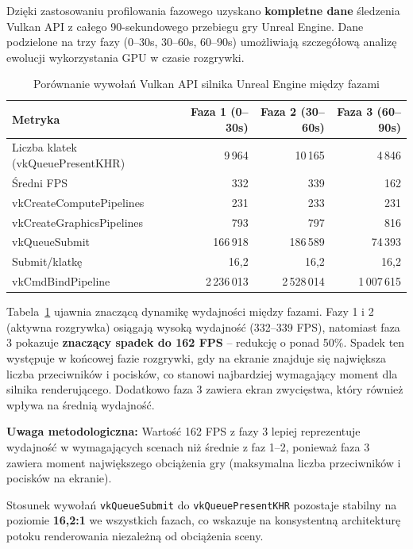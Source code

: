 Dzięki zastosowaniu profilowania fazowego uzyskano \textbf{kompletne dane} śledzenia Vulkan API z całego 90-sekundowego przebiegu gry Unreal Engine. 
Dane podzielone na trzy fazy (0--30s, 30--60s, 60--90s) umożliwiają szczegółową analizę ewolucji wykorzystania GPU w czasie rozgrywki.
\begingroup
  \setlength{\textfloatsep}{0.5\baselineskip}
  \setlength{\intextsep}{0.5\baselineskip}
  \begin{table}[H]
\centering
\caption{Porównanie wywołań Vulkan API silnika Unreal Engine między fazami}
\label{tab:unreal-vulkan-phases}
\small
\begin{tabular}{|l|r|r|r|}
\hline
\textbf{Metryka} & \textbf{Faza 1 (0--30s)} & \textbf{Faza 2 (30--60s)} & \textbf{Faza 3 (60--90s)} \\
\hline
Liczba klatek (vkQueuePresentKHR) & 9\,964 & 10\,165 & 4\,846 \\
Średni FPS & 332 & 339 & 162 \\
vkCreateComputePipelines & 231 & 233 & 231 \\
vkCreateGraphicsPipelines & 793 & 797 & 816 \\
vkQueueSubmit & 166\,918 & 186\,589 & 74\,393 \\
Submit/klatkę & 16,2 & 16,2 & 16,2 \\
vkCmdBindPipeline & 2\,236\,013 & 2\,528\,014 & 1\,007\,615 \\
\hline
\end{tabular}
\end{table}

\endgroup
Tabela~\ref{tab:unreal-vulkan-phases} ujawnia znaczącą dynamikę wydajności między fazami. 
Fazy 1 i 2 (aktywna rozgrywka) osiągają wysoką wydajność
(332--339 FPS), natomiast faza 3 pokazuje \textbf{znaczący spadek do 162 FPS} -- redukcję o
ponad 50\%. Spadek ten występuje w końcowej fazie
rozgrywki, gdy na ekranie znajduje się największa liczba przeciwników i pocisków, co stanowi 
najbardziej wymagający moment dla silnika renderującego.
Dodatkowo faza 3 zawiera ekran zwycięstwa, który również wpływa na średnią wydajność.

\textbf{Uwaga metodologiczna:} Wartość 162 FPS z fazy 3 lepiej reprezentuje wydajność w wymagających
scenach niż średnie z faz 1--2, ponieważ faza 3 zawiera moment największego obciążenia gry
(maksymalna liczba przeciwników i pocisków na ekranie).

Stosunek wywołań \texttt{vkQueueSubmit} do \texttt{vkQueuePresentKHR} pozostaje stabilny na poziomie \textbf{16,2:1} we wszystkich fazach, co
wskazuje na konsystentną architekturę potoku renderowania niezależną od obciążenia sceny.

